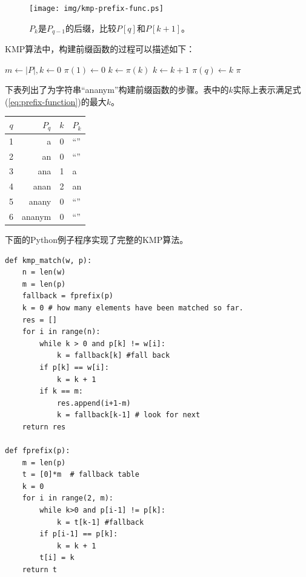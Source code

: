 \documentclass[UTF8]{article}
\begin{document}
\begin{figure}[htbp]
 \centering
 \texttt{[image: img/kmp-prefix-func.ps]}
 \caption{$P_k$是$P_{q-1}$的后缀，比较$P[q]$和$P[k+1]$。}
 \label{fig:kmp-prefix-func}
\end{figure}

KMP算法中，构建前缀函数的过程可以描述如下：

\begin{algorithmic}[1]
  \State $m \gets |P|, k \gets 0$
  \State $\pi(1) \gets 0$
      \State $k \gets \pi(k)$
    \EndWhile
      \State $k \gets k + 1$
    \EndIf
    \State $\pi(q) \gets k$
  \EndFor
  \State \Return $\pi$
\EndFunction
\end{algorithmic}

下表列出了为字符串“ananym”构建前缀函数的步骤。表中的$k$实际上表示满足式(\ref{eq:prefix-function})的最大$k$。

\begin{tabular}{|c|r|c|l|}
\hline
$q$ & $P_q$ & $k$ & $P_k$ \\
\hline
1 & a & 0 & ``'' \\
2 & an & 0 & ``'' \\
3 & ana & 1 & a \\
4 & anan & 2 & an  \\
5 & anany & 0 & ``'' \\
6 & ananym & 0 & ``'' \\
\hline
\end{tabular}

下面的Python例子程序实现了完整的KMP算法。

\lstset{language=Python}
\begin{lstlisting}
def kmp_match(w, p):
    n = len(w)
    m = len(p)
    fallback = fprefix(p)
    k = 0 # how many elements have been matched so far.
    res = []
    for i in range(n):
        while k > 0 and p[k] != w[i]:
            k = fallback[k] #fall back
        if p[k] == w[i]:
            k = k + 1
        if k == m:
            res.append(i+1-m)
            k = fallback[k-1] # look for next
    return res

def fprefix(p):
    m = len(p)
    t = [0]*m  # fallback table
    k = 0
    for i in range(2, m):
        while k>0 and p[i-1] != p[k]:
            k = t[k-1] #fallback
        if p[i-1] == p[k]:
            k = k + 1
        t[i] = k
    return t
\end{lstlisting}
\end{document}
